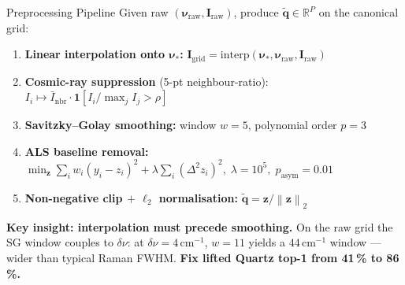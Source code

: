 \documentclass[aspectratio=169,10pt]{beamer}
\newcommand{\norm}[1]{\left\|#1\right\|}
\begin{document}
\begin{frame}{Preprocessing Pipeline}
  Given raw $(\boldsymbol{\nu}_\text{raw},\mathbf{I}_\text{raw})$,
  produce $\tilde{\mathbf{q}}\in\mathbb{R}^P$ on the canonical grid:

  \vspace{0.10cm}
  \small
  \begin{enumerate}\setlength\itemsep{0.12cm}
    \item \textbf{Linear interpolation onto $\boldsymbol{\nu}_*$:}\enspace
          $\mathbf{I}_\text{grid}=\mathrm{interp}(\boldsymbol{\nu}_*,
          \boldsymbol{\nu}_\text{raw},\mathbf{I}_\text{raw})$

    \item \textbf{Cosmic-ray suppression} (5-pt neighbour-ratio):\enspace
          $I_i\mapsto\bar{I}_\text{nbr}
          \cdot\mathbf{1}\!\left[{I_i}/{\max_j I_j}>\rho\right]$

    \item \textbf{Savitzky--Golay smoothing:}\enspace
          window $w=5$, polynomial order $p=3$

    \item \textbf{ALS baseline removal:}\enspace
          $\displaystyle\min_{\mathbf{z}}\sum_i w_i(y_i-z_i)^2
          +\lambda\sum_i(\Delta^2 z_i)^2,\;\lambda=10^5,\;p_\text{asym}=0.01$

    \item \textbf{Non-negative clip $+$ $\ell_2$ normalisation:}\enspace
          $\tilde{\mathbf{q}}=\mathbf{z}/\norm{\mathbf{z}}_2$
  \end{enumerate}

  \vspace{0.16cm}
  \begin{tcolorbox}[insightbox]
    \small\textbf{Key insight: interpolation must precede smoothing.}
    On the raw grid the SG window couples to $\delta\nu$: at
    $\delta\nu=4\,\text{cm}^{-1}$, $w=11$ yields a $44\,\text{cm}^{-1}$
    window --- wider than typical Raman FWHM.
    \textbf{Fix lifted Quartz top-1 from 41\,\% to 86\,\%.}
  \end{tcolorbox}
\end{frame}
\end{document}

